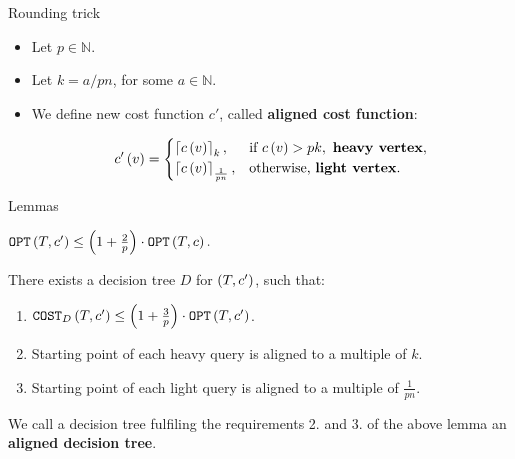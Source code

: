 \begin{frame}{Rounding trick}
    \begin{itemize}
        \item Let $p \in \mathbb{N}$.
        \item Let $k=a/pn$, for some $a\in \mathbb{N}$.
        \pause
        \item We define new cost function $c'$, called \textbf{aligned cost function}:

    $$
c'\left( v \right)=\begin{cases}
    \left\lceil c\left( v \right) \right\rceil_k, & \text{if } c\left( v \right)>pk, \text{ \textbf{heavy vertex}},\\
    \left\lceil c\left( v \right) \right\rceil_{\frac{1}{pn}}, & \text{otherwise, \textbf{light vertex}}.\\
\end{cases}
$$
    \end{itemize}
\end{frame}

\begin{frame}{Lemmas}
     
\begin{lemma}\label{rounded_dt_lemma}
    $
    \texttt{OPT}\left( T,c' \right)\leq \left( 1+\frac{2}{p} \right)\cdot \texttt{OPT}\left( T,c \right).
    $
\end{lemma}
\pause
\begin{lemma}\label{aligned_dts_lemma}
    There exists a decision tree $D$ for $\left( T,c' \right)$, such that:
    \begin{enumerate}
        \item $\texttt{COST}_{D}\left( T, c' \right)\leq \left( 1+\frac{3}{p} \right)\cdot\texttt{OPT}\left( T, c' \right)$.
        \item Starting point of each heavy query is aligned to a multiple of $k$.
        \item Starting point of each light query is aligned to a multiple of $\frac{1}{pn}$.
    \end{enumerate}
\end{lemma}
\pause

We call a decision tree fulfiling the requirements 2. and 3. of the above lemma an \textbf{aligned decision tree}.
\end{frame}


